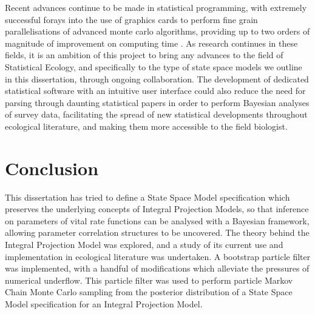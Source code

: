 \documentclass[a4paper,12pt]{article}
\begin{document}
Recent advances continue to be made in statistical programming, with extremely successful forays into the use of graphics cards to perform fine grain parallelisations of advanced monte carlo algorithms, providing up to two orders of magnitude of improvement on computing time \citep{Lee, MassivelyParallel, GPUHMC}. As research continues in these fields, it is an ambition of this project to bring any advances to the field of Statistical Ecology, and specifically to the type of state space models we outline in this dissertation, through ongoing collaboration. The development of dedicated statistical software with an intuitive user interface could also reduce the need for parsing through daunting statistical papers in order to perform Bayesian analyses of survey data, facilitating the spread of new statistical developments throughout ecological literature, and making them more accessible to the field biologist.

\section{Conclusion}

This dissertation has tried to define a State Space Model specification which preserves the underlying concepts of Integral Projection Models, so that inference on parameters of vital rate functions can be analysed with a Bayesian framework, allowing parameter correlation structures to be uncovered. The theory behind the Integral Projection Model was explored, and a study of its current use and implementation in ecological literature was undertaken. A bootstrap particle filter was implemented, with a handful of modifications which alleviate the pressures of numerical underflow. This particle filter was used to perform particle Markov Chain Monte Carlo sampling from the posterior distribution of a State Space Model specification for an Integral Projection Model.
\end{document}
